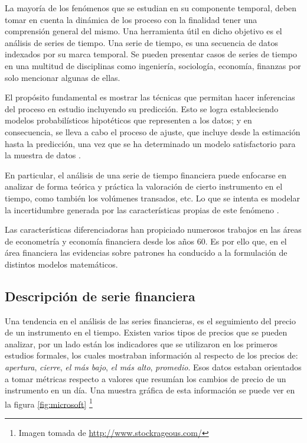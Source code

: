 La mayoría de los fenómenos que se estudian en su componente temporal, deben
tomar en cuenta la dinámica de los proceso con la finalidad tener una
comprensión general del mismo. Una herramienta útil en dicho objetivo es el
análisis de series de tiempo. Una serie de tiempo, es una secuencia de datos
indexados por su marca temporal. Se pueden presentar casos de series de tiempo
en una multitud de disciplinas como ingeniería, sociología, economía, finanzas
por solo mencionar algunas de ellas.

El propósito fundamental es mostrar las técnicas que permitan hacer inferencias
del proceso en estudio incluyendo su predicción. Esto se logra estableciendo
modelos probabilísticos hipotéticos que representen a los datos; y en
consecuencia, se lleva a cabo el proceso de ajuste, que incluye desde la
estimación hasta la predicción, una vez que se ha determinado un modelo
satisfactorio para la muestra de datos \cite{box2011time}
\cite{vandaele1983applied}. 

En particular, el análisis de una serie de tiempo financiera puede enfocarse en
analizar de forma teórica y práctica la valoración de cierto instrumento en el
tiempo, como también los volúmenes transados, etc. Lo que se intenta es modelar
la incertidumbre generada por las características propias de este fenómeno
\cite{tsay2005analysis}. 

Las características diferenciadoras han propiciado numerosos trabajos en las
áreas de econometría y economía financiera desde los años 60. Es por ello que,
en el área financiera las evidencias sobre patrones ha conducido a la
formulación de distintos modelos matemáticos.

\subsection{Descripción de serie financiera}

Una tendencia en el análisis de las series financieras, es el seguimiento del
precio de un instrumento en el tiempo.
Existen varios tipos de precios que se pueden analizar, por un lado están los
indicadores que se utilizaron en los primeros estudios formales, los cuales
mostraban información al respecto de los precios de: \emph{apertura},
\emph{cierre}, \emph{el más bajo}, \emph{el más alto}, \emph{promedio}. Esos
datos estaban orientados a tomar métricas respecto a valores que resumían los
cambios de precio de un instrumento en un día. Una muestra gráfica de esta
información se puede ver en la figura \ref{fig:microsoft} \footnote{Imagen
tomada de \url{http://www.stockrageous.com/}}

